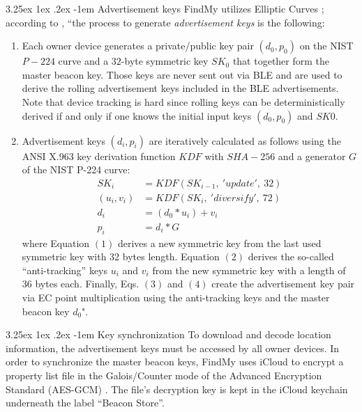 \documentclass[english]{article}
\makeatletter
\renewcommand\paragraph{\@startsection{paragraph}{5}{\z@}%
  {3.25ex \@plus1ex \@minus.2ex}%
  {-1em}%
  {\normalfont\normalsize\bfseries}}
\makeatother
\begin{document}
\paragraph{Advertisement keys}\label{keys}
FindMy utilizes Elliptic Curves \cite{ec}; according to \cite{aps,whocanfind}, ``the process to generate \textit{advertisement keys} is the following:
\begin{enumerate}
  \item Each owner device generates a private/public key pair
  $(d_0, p_0)$ on the NIST $P-224$ curve and a $32$-byte symmetric key $SK_0$ that together form the master beacon key. Those keys are never sent out via BLE and are used to derive the rolling advertisement keys included in the BLE advertisements. Note that device tracking is hard since rolling keys can be deterministically derived if and only if one knows the initial input keys $(d_0, p_0)$ and $SK0$.
  \item Advertisement keys $(d_i,p_i)$ are iteratively calculated as follows using the ANSI X.963 key derivation function $KDF$ \cite{ANSI} with $SHA-256$ \cite{sha} and a generator $G$ of the NIST P-224 curve:
  \begin{align}
    SK_i &= KDF(SK_{i-1},\ 'update',\ 32) \\
    (u_i, v_i) &= KDF(SK_i,\ 'diversify',\ 72) \\
    d_i &= (d_0 * u_i) + v_i \\
    p_i &= d_i * G
  \end{align}
  where Equation $(1)$ derives a new symmetric key from the last used symmetric key with 32 bytes length. Equation $(2)$ derives the so-called “anti-tracking” keys $u_i$ and $v_i$ from the new symmetric key with a length of $36$ bytes each. Finally, Eqs. $(3)$ and $(4)$ create the advertisement key pair via EC point multiplication using the anti-tracking keys and the master beacon key $d_0$".
\end{enumerate}

\paragraph{Key synchronization}
To download and decode location information, the advertisement keys must be accessed by all owner devices. In order to synchronize the master beacon keys, FindMy uses iCloud to encrypt a property list file in the Galois/Counter mode of the Advanced Encryption Standard (AES-GCM) \cite{gcm}. The file's decryption key is kept in the iCloud keychain underneath the label “Beacon Store”.
\end{document}
